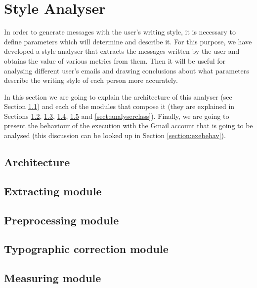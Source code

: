 \chapter{Style Analyser}
\label{cap:analyser}

In order to generate messages with the user's writing style, it is necessary to define parameters which will determine and describe it. For this purpose, we have developed a style analyser that extracts the messages written by the user and obtains the value of various metrics from them. Then it will be useful for analysing different user's emails and drawing conclusions about what parameters describe the writing style of each person more accurately.

In this section we are going to explain the architecture of this analyser (see Section \ref{section:stylearch}) and each of the modules that compose it (they are explained in Sections \ref{section:extmod}, \ref{section:prepmod}, \ref{section:typomod}, \ref{section:measmod} and \ref{sect:analyserclass}). Finally, we are going to present the behaviour of the execution with the Gmail account that is going to be analysed (this discussion can be looked up in Section \ref{section:exebehav}).

\section{Architecture} \label{section:stylearch}


\section{Extracting module} \label{section:extmod}


\section{Preprocessing module} \label{section:prepmod}


\section{Typographic correction module} \label{section:typomod}


\section{Measuring module} \label{section:measmod}


